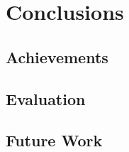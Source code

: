 \documentclass{report}
\begin{document}
\chapter{Conclusions}  %

\section{Achievements}

\section{Evaluation}




\section{Future Work}
\end{document}
